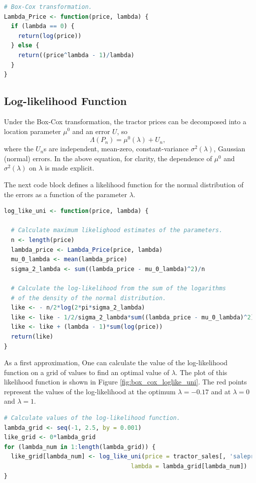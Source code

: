 \vspace{1.0in}

\begin{lstlisting}[language=R]
# Box-Cox transformation.
Lambda_Price <- function(price, lambda) {
  if (lambda == 0) {
    return(log(price))
  } else {
    return((price^lambda - 1)/lambda)
  }
}
\end{lstlisting}

\pagebreak
\subsection{Log-likelihood Function}

Under the Box-Cox transformation,
the tractor prices can be decomposed into a location parameter $\mu^0$ 
and an error $U$, so
$$\Lambda(P_n) = \mu^0(\lambda) + U_n,$$
where the $U_n$s are independent, mean-zero, constant-variance 
$\sigma^2(\lambda)$, Gaussian (normal) errors. 
In the above equation, for clarity, the dependence of $\mu^0$ and 
$\sigma^2(\lambda)$ on $\lambda$ is made explicit.


The next code block defines a likelihood function for the normal distribution of the errors
as a function of the parameter $\lambda$.

\begin{lstlisting}[language=R]
log_like_uni <- function(price, lambda) {

  # Calculate maximum likelighood estimates of the parameters.
  n <- length(price)
  lambda_price <- Lambda_Price(price, lambda)
  mu_0_lambda <- mean(lambda_price)
  sigma_2_lambda <- sum((lambda_price - mu_0_lambda)^2)/n

  # Calculate the log-likelihood from the sum of the logarithms
  # of the density of the normal distribution.
  like <- - n/2*log(2*pi*sigma_2_lambda)
  like <- like - 1/2/sigma_2_lambda*sum((lambda_price - mu_0_lambda)^2)
  like <- like + (lambda - 1)*sum(log(price))
  return(like)
}
\end{lstlisting}

\pagebreak
As a first approximation, 
One can calculate the value of the log-likelihood function on a grid of values
to find an optimal value of $\lambda$.
The plot of this likelihood function is shown in Figure \ref{fig:box_cox_loglike_uni}.
The red points represent the values of the log-likelihood 
at the optimum $\lambda = -0.17$ and at $\lambda = 0$ and $\lambda = 1$.

\begin{lstlisting}[language=R]
# Calculate values of the log-likelihood function.
lambda_grid <- seq(-1, 2.5, by = 0.001)
like_grid <- 0*lambda_grid
for (lambda_num in 1:length(lambda_grid)) {
  like_grid[lambda_num] <- log_like_uni(price = tractor_sales[, 'saleprice'],
                                    lambda = lambda_grid[lambda_num])
}
\end{lstlisting}

